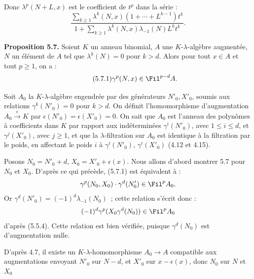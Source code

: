 
Donc \(\lambda^p(N+L,x)\) est le coefficient de \(t^p\) dans la série :
\[
  \frac{\displaystyle\sum_{k\ge1}\lambda^k(N,x)
        (1+\cdots+L^{k-1})t^k}
       {\displaystyle 1+\sum_{k\ge1}\lambda^k(N,x)
        \lambda_{-1}(N)L^k t^k}.
\]

\textbf{Proposition 5.7.} Soient \(K\) un anneau binomial, \(A\) une \(K\)-\(\lambda\)-algèbre augmentée, \(N\) un élément de \(A\) tel que \(\lambda^k(N)=0\) pour \(k>d\). Alors pour tout \(x\in A\) et tout \(p\ge1\), on a :
\begin{equation}\tag{5.7.1}
  \gamma^p(N,x)\in\Fil^{p-d}A.
\end{equation}

Soit \(A_0\) la \(K\)-\(\lambda\)-algèbre engendrée par des générateurs \(N'_0,X'_0\), soumis aux relations \(\gamma^k(N'_0)=0\) pour \(k>d\). On définit l'homomorphisme d'augmentation \(A_0\xrightarrow{\epsilon}K\) par \(\epsilon(N'_0)=\epsilon(X'_0)=0\). On sait que \(A_0\) est l'anneau des polynômes à coefficients dans \(K\) par rapport aux indéterminées \(\gamma^i(N'_0)\), avec \(1\le i\le d\), et \(\gamma^j(X'_0)\), avec \(j\ge1\), et que la \(\lambda\)-filtration sur \(A_0\) est identique à la filtration par le poids, en affectant le poids \(i\) à \(\gamma^i(N'_0)\), \(\gamma^i(X'_0)\) (4.12 et 4.15).

Posons \(N_0=N'_0+d\), \(X_0=X'_0+\epsilon(x)\). Nous allons d'abord montrer 5.7 pour \(N_0\) et \(X_0\). D'après ce qui précède, (5.7.1) est équivalent à :
\[
  \gamma^p(N_0,X_0)\cdot\gamma^d(N'_0)\in\Fil^pA_0.
\]
Or \(\gamma^d(N'_0)=(-1)^d\lambda_{-1}(N_0)\)~; cette relation s'écrit donc :
\[
  (-1)^d\gamma^p(X_0\gamma^d(N_0))\in\Fil^pA_0
\]
d'après (5.5.4). Cette relation est bien vérifiée, puisque \(\gamma^d(N_0)\) est d'augmentation nulle.

D'après 4.7, il existe un \(K\)-\(\lambda\)-homomorphisme \(A_0\longrightarrow A\) compatible aux augmentations envoyant \(N'_0\) sur \(N-d\), et \(X'_0\) sur \(x-\epsilon(x)\), donc \(N_0\) sur \(N\) et \(X_0\) 
